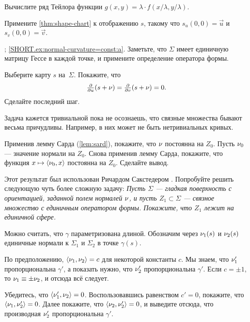 \begin{multicols}{2}
Вычислите ряд Тейлора функции $g(x,y)= \lambda \cdot f( x/ \lambda , y/\lambda)$.

Примените \ref{thm:shape-chart} к отображению $s$, такому что $s_u(0,0)=\vec u$ и $s_v(0,0)=\vec v$.

\parbf{\ref{ex:normal-curvature=const}}; \ref{SHORT.ex:normal-curvature=const:a}.
Заметьте, что $\Sigma$ имеет единичную матрицу Гессе в каждой точке, и примените определение оператора формы.

Выберите карту $s$ на~$\Sigma$.
Покажите, что
\[\tfrac{\partial }{\partial u}(s+\nu)
=
\tfrac{\partial }{\partial v}(s+\nu)
=
0.\]
Сделайте последний шаг.

Задача кажется тривиальной пока не осознаешь, что связные множества бывают весьма причудливы.
Например, в них может не быть нетривиальных кривых.

\medskip

Применив лемму Сарда (\ref{lem:sard}), покажите, что $\nu$ постоянна на $Z_0$.
Пусть $\nu_0$ --- значение нормали на $Z_0$.
Снова применив лемму Сарда, покажите, что функция $x\mapsto \langle \nu_0,x\rangle$ постоянна на $Z_0$.
Сделайте вывод.

Этот результат был использован Ричардом Сакстедером \cite[Lemma 6]{sacksteder}.  
Попробуйте решить следующую чуть более сложную задачу:  
\textit{Пусть $\Sigma$ --- гладкая поверхность с ориентацией, заданной полем нормалей $\nu$, и пусть $Z_1\subset \Sigma$ --- связное множество с единичным оператором формы.  
Покажите, что $Z_1$ лежит на единичной сфере.}


Можно считать, что $\gamma$ параметризована длиной.
Обозначим через $\nu_1(s)$ и $\nu_2(s)$ единичные нормали к $\Sigma_1$ и $\Sigma_2$ в точке $\gamma(s)$.

По предположению, $\langle \nu_1,\nu_2\rangle= c$ для некоторой константы $c$.
Мы знаем, что
$\nu_1'$ пропорциональна $\gamma'$, а показать нужно, что $\nu_2'$ пропорциональна $\gamma'$.
Если $c=\pm1$, то $\nu_1\equiv\pm \nu_2$, и отсюда всё следует.

Убедитесь, что $\langle\nu_1',\nu_2\rangle=0$.
Воспользовавшись равенством $c'=0$, покажите, что $\langle\nu_1,\nu_2'\rangle=0$.
Далее покажите, что $\langle\nu_2,\nu_2'\rangle=0$, и выведите отсюда, что производная $\nu_2'$ пропорциональна $\gamma'$.


\end{multicols}
